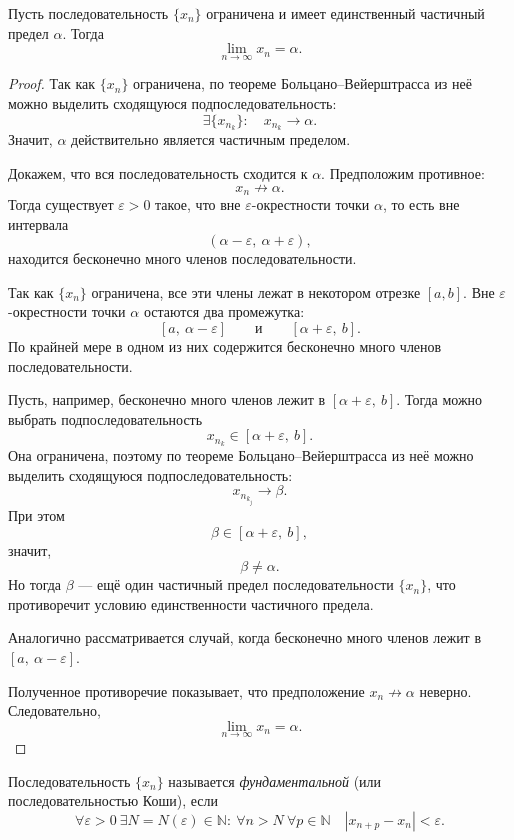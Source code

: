 
\begin{theorem}
Пусть последовательность \(\{x_n\}\) ограничена и имеет единственный частичный
предел \(\alpha\). Тогда
\[
\lim_{n\to\infty} x_n = \alpha.
\]
\end{theorem}

\begin{proof}
Так как \(\{x_n\}\) ограничена, по теореме Больцано--Вейерштрасса из неё можно
выделить сходящуюся подпоследовательность:
\[
\exists \{x_{n_k}\}:\quad x_{n_k}\to \alpha.
\]
Значит, \(\alpha\) действительно является частичным пределом.

Докажем, что вся последовательность сходится к \(\alpha\). Предположим противное:
\[
x_n \not\to \alpha.
\]
Тогда существует \(\varepsilon>0\) такое, что вне \(\varepsilon\)-окрестности
точки \(\alpha\), то есть вне интервала
\[
(\alpha-\varepsilon,\ \alpha+\varepsilon),
\]
находится бесконечно много членов последовательности.

Так как \(\{x_n\}\) ограничена, все эти члены лежат в некотором отрезке
\([a,b]\). Вне \(\varepsilon\)-окрестности точки \(\alpha\) остаются два
промежутка:
\[
[a,\ \alpha-\varepsilon]
\qquad\text{и}\qquad
[\alpha+\varepsilon,\ b].
\]
По крайней мере в одном из них содержится бесконечно много членов
последовательности.

Пусть, например, бесконечно много членов лежит в \([\alpha+\varepsilon,\ b]\).
Тогда можно выбрать подпоследовательность
\[
x_{n_k}\in[\alpha+\varepsilon,\ b].
\]
Она ограничена, поэтому по теореме Больцано--Вейерштрасса из неё можно выделить
сходящуюся подпоследовательность:
\[
x_{n_{k_j}}\to \beta.
\]
При этом
\[
\beta\in[\alpha+\varepsilon,\ b],
\]
значит,
\[
\beta\neq \alpha.
\]
Но тогда \(\beta\) --- ещё один частичный предел последовательности \(\{x_n\}\),
что противоречит условию единственности частичного предела.

Аналогично рассматривается случай, когда бесконечно много членов лежит в \([a,\
\alpha-\varepsilon]\).

Полученное противоречие показывает, что предположение \(x_n \not\to \alpha\)
неверно. Следовательно,
\[
\lim_{n\to\infty} x_n = \alpha.
\]
\end{proof}


\begin{definition}
Последовательность \(\{x_n\}\) называется \emph{фундаментальной}
(или последовательностью Коши), если
\[
\forall \varepsilon>0\ \exists N=N(\varepsilon)\in\mathbb N:\ 
\forall n>N\ \forall p\in\mathbb N
\quad |x_{n+p}-x_n|<\varepsilon.
\]
\end{definition}

